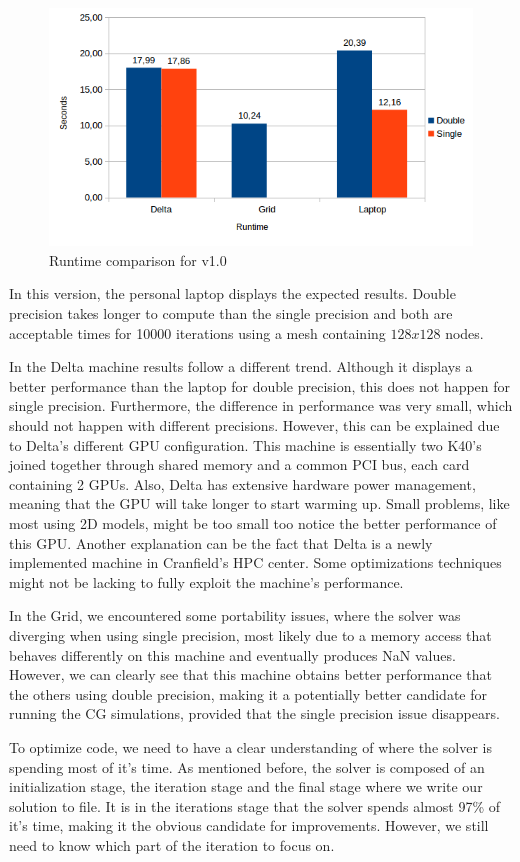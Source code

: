 \documentclass[12pt]{book}
\begin{document}
  \begin{figure}[H]
  	\centering
  	\includegraphics[width=\linewidth]{Resources/Images/v1.png}
  	\caption{Runtime comparison for v1.0}
  	\label{fig:v1}
  \end{figure}
  
  In this version, the personal laptop displays the expected results. Double precision takes longer to compute than the single precision and both are acceptable times for 10000 iterations using a mesh containing $128x128$ nodes. \par
  In the Delta machine results follow a different trend. Although it displays a better performance than the laptop for double precision, this does not happen for single precision. Furthermore, the difference in performance was very small, which should not happen with different precisions. However, this can be explained due to Delta's different GPU configuration. This machine is essentially two K40's joined together through shared memory and a common PCI bus, each card containing 2 GPUs. Also, Delta has extensive hardware power management, meaning that the GPU will take longer to start warming up. Small problems, like most using 2D models, might be too small too notice the better performance of this GPU. Another explanation can be the fact that Delta is a newly implemented machine in Cranfield's HPC center. Some optimizations techniques might not be lacking to fully exploit the machine's performance.\par
  In the Grid, we encountered some portability issues, where the solver was diverging when using single precision, most likely due to a memory access that behaves differently on this machine and eventually produces NaN values. However, we can clearly see that this machine obtains better performance that the others using double precision, making it a potentially better candidate for running the CG simulations, provided that the single precision issue disappears.\par
  To optimize code, we need to have a clear understanding of where the solver is spending most of it's time. As mentioned before, the solver is composed of an initialization stage, the iteration stage and the final stage where we write our solution to file. It is in the iterations stage that the solver spends almost 97\% of it's time, making it the obvious candidate for improvements. However, we still need to know which part of the iteration to focus on. 
  
\end{document}
